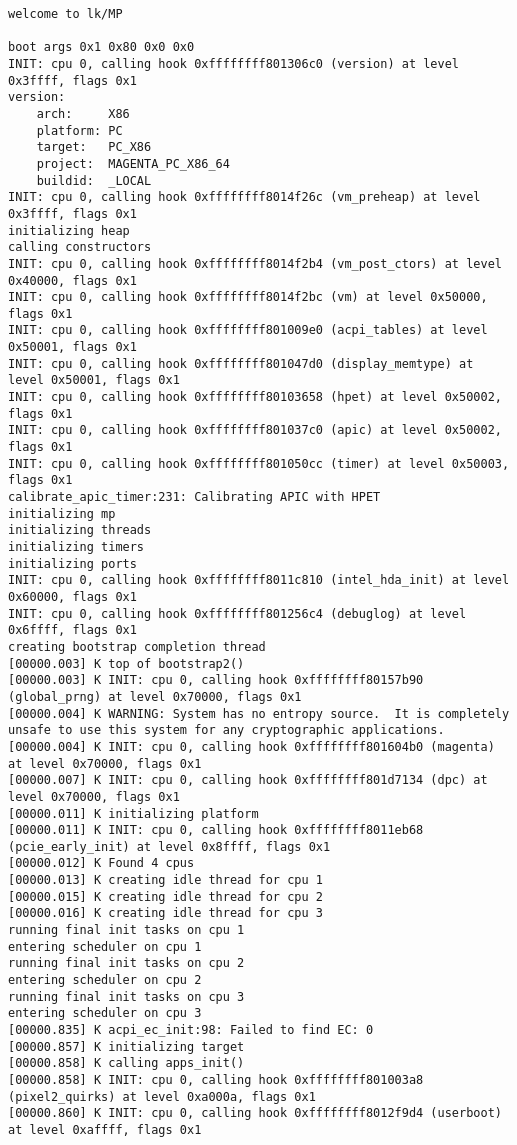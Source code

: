 \documentclass[14pt,a4paper]{article}
\begin{document}
\begin{lstlisting}
welcome to lk/MP

boot args 0x1 0x80 0x0 0x0
INIT: cpu 0, calling hook 0xffffffff801306c0 (version) at level 0x3ffff, flags 0x1
version:
	arch:     X86
	platform: PC
	target:   PC_X86
	project:  MAGENTA_PC_X86_64
	buildid:  _LOCAL
INIT: cpu 0, calling hook 0xffffffff8014f26c (vm_preheap) at level 0x3ffff, flags 0x1
initializing heap
calling constructors
INIT: cpu 0, calling hook 0xffffffff8014f2b4 (vm_post_ctors) at level 0x40000, flags 0x1
INIT: cpu 0, calling hook 0xffffffff8014f2bc (vm) at level 0x50000, flags 0x1
INIT: cpu 0, calling hook 0xffffffff801009e0 (acpi_tables) at level 0x50001, flags 0x1
INIT: cpu 0, calling hook 0xffffffff801047d0 (display_memtype) at level 0x50001, flags 0x1
INIT: cpu 0, calling hook 0xffffffff80103658 (hpet) at level 0x50002, flags 0x1
INIT: cpu 0, calling hook 0xffffffff801037c0 (apic) at level 0x50002, flags 0x1
INIT: cpu 0, calling hook 0xffffffff801050cc (timer) at level 0x50003, flags 0x1
calibrate_apic_timer:231: Calibrating APIC with HPET
initializing mp
initializing threads
initializing timers
initializing ports
INIT: cpu 0, calling hook 0xffffffff8011c810 (intel_hda_init) at level 0x60000, flags 0x1
INIT: cpu 0, calling hook 0xffffffff801256c4 (debuglog) at level 0x6ffff, flags 0x1
creating bootstrap completion thread
[00000.003] K top of bootstrap2()
[00000.003] K INIT: cpu 0, calling hook 0xffffffff80157b90 (global_prng) at level 0x70000, flags 0x1
[00000.004] K WARNING: System has no entropy source.  It is completely unsafe to use this system for any cryptographic applications.
[00000.004] K INIT: cpu 0, calling hook 0xffffffff801604b0 (magenta) at level 0x70000, flags 0x1
[00000.007] K INIT: cpu 0, calling hook 0xffffffff801d7134 (dpc) at level 0x70000, flags 0x1
[00000.011] K initializing platform
[00000.011] K INIT: cpu 0, calling hook 0xffffffff8011eb68 (pcie_early_init) at level 0x8ffff, flags 0x1
[00000.012] K Found 4 cpus
[00000.013] K creating idle thread for cpu 1
[00000.015] K creating idle thread for cpu 2
[00000.016] K creating idle thread for cpu 3
running final init tasks on cpu 1
entering scheduler on cpu 1
running final init tasks on cpu 2
entering scheduler on cpu 2
running final init tasks on cpu 3
entering scheduler on cpu 3
[00000.835] K acpi_ec_init:98: Failed to find EC: 0
[00000.857] K initializing target
[00000.858] K calling apps_init()
[00000.858] K INIT: cpu 0, calling hook 0xffffffff801003a8 (pixel2_quirks) at level 0xa000a, flags 0x1
[00000.860] K INIT: cpu 0, calling hook 0xffffffff8012f9d4 (userboot) at level 0xaffff, flags 0x1

\end{lstlisting}
\end{document}
